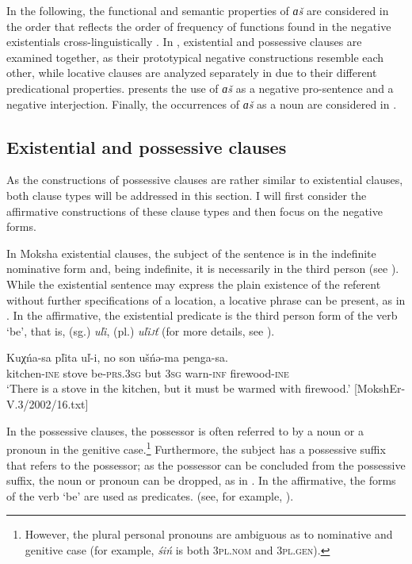 \documentclass[output=paper,colorlinks,citecolor=brown,draft,draftmode]{langscibook}
\begin{document}
  In the following, the functional and semantic properties of \textit{ɑš} are considered in the order that reflects the order of frequency of functions found in the negative existentials cross-linguistically \citep[118--119]{Veselinova2013}. In , existential and possessive clauses are examined together, as their prototypical negative constructions resemble each other, while locative clauses are analyzed separately in  due to their different predicational properties.  presents the use of \textit{ɑš} as a negative pro-sentence and a negative interjection. Finally, the occurrences of \textit{ɑš} as a noun are considered in .

\subsection{Existential and possessive clauses}\label{sec:2:5.2}

As the constructions of possessive clauses are rather similar to
existential clauses, both clause types will be addressed in this section. I
will first consider the affirmative constructions of these clause types and then focus on the negative forms.

  In Moksha existential clauses, the subject of the sentence is in the indefinite nominative form and, being indefinite, it is necessarily in the third person (see ). While the existential sentence may express the plain existence of the referent without further specifications of a location, a locative phrase can be present, as in . In the affirmative, the existential predicate is the third person form of the verb `be', that is, (sg.) \textit{uľi}, (pl.) \textit{uľi\textsc{j}ť} (for more details, see \citealt[47--52]{Hamari2007}).

\ea\label{ex:moksha-stove}
\gll Kuχńa-sa pľita uľ-i, no son ušńə-ma penga-sa.\\
kitchen-\textsc{ine} stove be-\textsc{prs.3sg} but \textsc{3sg} warn-\textsc{inf} firewood-\textsc{ine}\\
\glt `There is a stove in the kitchen, but it must be warmed with firewood.' [MokshEr-V.3/2002/16.txt]
\z

	In the possessive clauses, the possessor is often referred to by a noun or a pronoun in the genitive case.\footnote{However, the plural personal pronouns are ambiguous as to nominative and genitive case (for example, \textit{śiń} is both \textsc{3pl.nom} and 3\textsc{pl.gen}).} Furthermore, the subject has a possessive suffix that refers to the possessor; as the possessor can be concluded from the possessive suffix, the noun or pronoun can be dropped, as in . In the affirmative, the forms of the verb `be' are used as predicates. (see, for example, \citealt[52--57]{Hamari2007}).
\end{document}
